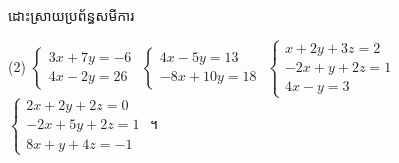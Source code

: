 \begin{example}[លំហាត់គំរូ ២]
ដោះស្រាយប្រព័ន្ធសមីការ
\begin{tasks}(2)
  \task $\begin{cases} 3x + 7y = -6\\ 4x - 2y = 26 \end{cases}$
  \task $\begin{cases} 4x - 5y = 13\\ -8x + 10y = 18 \end{cases}$
  \task $\begin{cases} x + 2y + 3z = 2\\ -2x + y + 2z = 1\\ 4x - y = 3 \end{cases}$
  \task $\begin{cases} 2x + 2y + 2z = 0\\ -2x + 5y + 2z = 1\\ 8x + y + 4z = -1 \end{cases}$ ។
\end{tasks}
\end{example}
\ans
